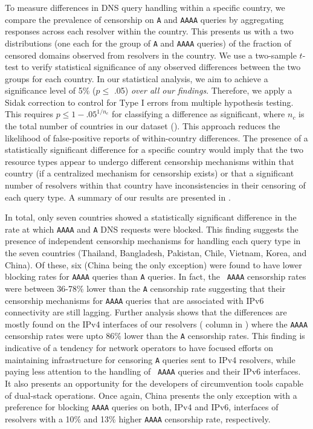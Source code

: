 To measure differences in DNS query handling within a specific country, we
compare the prevalence of censorship on {\tt A} and {\tt AAAA} queries by
aggregating responses across {each resolver within the country}. This presents
us with a two distributions (one each for the group of {\tt A} and {\tt AAAA}
queries) of the fraction of censored domains observed from resolvers in the
country.
%
We use a two-sample $t$-test to verify statistical significance of any observed
differences between the two groups for each country. In our statistical
analysis, we aim to achieve a significance level of 5\% ($p \leq$  .05)
\emph{over all our findings}. Therefore, we apply a Sidak correction
\cite{abdi2007bonferroni} to control for Type I errors from multiple hypothesis
testing. 
%
This requires $p \leq 1-{.05}^{1/n_{c}}$ for classifying a difference as
significant, where $n_c$ is the total number of countries in our dataset
(). This approach reduces the likelihood of false-positive reports
of within-country differences.
%
The presence of a statistically significant difference for a specific country
would imply that the two resource types appear to undergo different censorship
mechanisms within that country (if a centralized mechanism for censorship
exists) or that a significant number of resolvers within that country have
inconsistencies in their censoring of each query type.
%
A summary of our results are presented in . 

%
In total, only seven countries showed a statistically significant difference
in the rate at which {\tt AAAA} and {\tt A} DNS requests were blocked. 
%
This finding suggests the presence of independent censorship mechanisms for
handling each query type in the seven countries (Thailand, Bangladesh,
Pakistan, Chile, Vietnam, Korea, and China).
%
Of these, six (China being the only exception) were found to have lower
blocking rates for {\tt AAAA} queries than {\tt A} queries. In fact, the {\tt
AAAA} censorship rates were between 36-78\% lower than the {\tt A} censorship
rate suggesting that their censorship mechanisms for {\tt AAAA} queries that
are associated with IPv6 connectivity are still lagging. 
%
Further analysis shows that the differences are mostly found on the IPv4
interfaces of our resolvers ( column in
) where the {\tt AAAA} censorship rates were upto
86\% lower than the {\tt A} censorship rates. 
%
This finding is indicative of a tendency for network operators to have
focused efforts on maintaining infrastructure for censoring {\tt A} queries
sent to IPv4 resolvers, while paying less attention to the handling of {\tt
AAAA} queries and their IPv6 interfaces. It also presents an opportunity for
the developers of circumvention tools capable of dual-stack operations.
%
Once again, China presents the only exception with a preference for blocking
{\tt AAAA} queries on both, IPv4 and IPv6, interfaces of resolvers with a 10\%
and 13\% higher {\tt AAAA} censorship rate, respectively.

